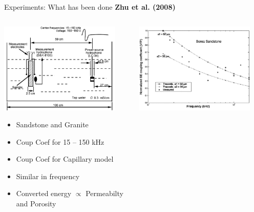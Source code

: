 \documentclass[utf8]{beamer} \usetheme{lfcr} %
\begin{document}
%
\begin{frame}{Experiments: What has been done}
  {\textbf{Zhu et al. (2008)}}

  \begin{columns}
    \begin{column}{0.5\textwidth}
      \includegraphics[width=0.9\textwidth]{Zhuetal2008_b_1}%

      \begin{itemize}
        \item {\small Sandstone and Granite}
        \item {\small Coup Coef for 15 -- 150 kHz}
        \item {\small Coup Coef for Capillary model}
        \item {\small Similar in frequency}
        \item {\small Converted energy $\propto$ Permeabilty and Porosity}

      \end{itemize}

    \end{column}

    \begin{column}{0.5\textwidth}
      \includegraphics[width=0.9\textwidth]{Zhuetal2008_b_2}%


\end{column}
\end{columns}
\end{frame}
\end{document}
